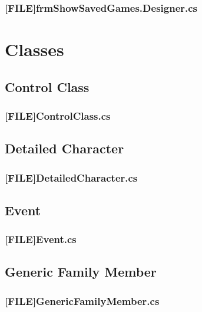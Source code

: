 \subsubsection{[FILE]frmShowSavedGames.Designer.cs}


\section{Classes}

\subsection{Control Class}
\subsubsection{[FILE]ControlClass.cs}


\subsection{Detailed Character}
\subsubsection{[FILE]DetailedCharacter.cs}


\subsection{Event}
\subsubsection{[FILE]Event.cs}


\subsection{Generic Family Member}
\subsubsection{[FILE]GenericFamilyMember.cs}


